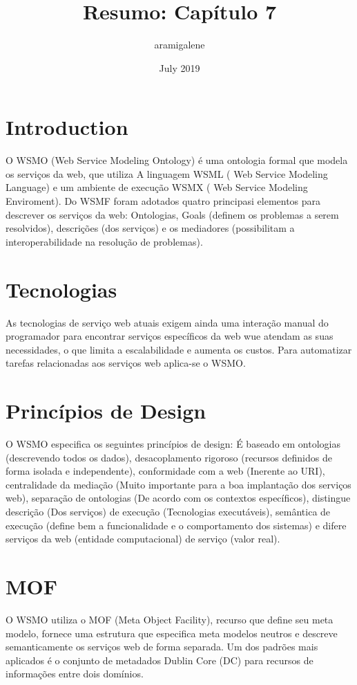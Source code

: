 \documentclass{article}
\title{Resumo: Capítulo 7}
\author{aramigalene }
\date{July 2019}
\begin{document}
\maketitle

\section{Introduction}


O WSMO (Web Service Modeling Ontology) é uma ontologia formal que modela os serviços da web, que utiliza  A linguagem WSML ( Web Service Modeling Language) e um ambiente de execução WSMX ( Web Service Modeling Enviroment). Do WSMF foram adotados quatro principasi elementos para descrever os serviços da web: Ontologias, Goals (definem os problemas a serem resolvidos), descrições (dos serviços) e os mediadores (possibilitam a interoperabilidade na resolução de problemas).
\section{Tecnologias}
As tecnologias de serviço web atuais exigem ainda uma interação manual do programador para encontrar serviços específicos da web wue atendam as suas necessidades, o que limita a escalabilidade e aumenta os custos. Para automatizar tarefas relacionadas aos serviços web aplica-se o WSMO.
\section{Princípios de Design}
O WSMO especifica os seguintes princípios de design: É baseado em ontologias (descrevendo todos os dados), desacoplamento rigoroso (recursos definidos de forma isolada e independente), conformidade  com a web (Inerente ao URI), centralidade da mediação (Muito importante para a boa implantação dos serviços web), separação de ontologias (De acordo com os contextos específicos), distingue descrição (Dos serviços) de execução (Tecnologias executáveis), semântica de execução (define bem a funcionalidade e o comportamento dos sistemas) e difere serviços da web (entidade computacional) de serviço (valor real).
\section{MOF}
O WSMO utiliza o MOF (Meta Object Facility), recurso que define seu meta modelo, fornece uma estrutura que especifica meta modelos neutros e descreve semanticamente os serviços web de forma separada. Um dos padrões mais aplicados é o conjunto de metadados Dublin Core (DC) para recursos de informações entre dois domínios.
\end{document}
